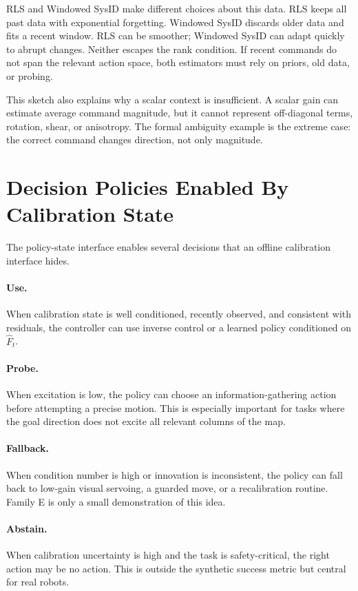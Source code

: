 \documentclass{article}
\newcommand{\cmaphat}{\hat F}
\begin{document}
RLS and Windowed SysID make different choices about this data. RLS keeps all
past data with exponential forgetting. Windowed SysID discards older data and
fits a recent window. RLS can be smoother; Windowed SysID can adapt quickly to
abrupt changes. Neither escapes the rank condition. If recent commands do not
span the relevant action space, both estimators must rely on priors, old data,
or probing.

This sketch also explains why a scalar context is insufficient. A scalar gain
can estimate average command magnitude, but it cannot represent off-diagonal
terms, rotation, shear, or anisotropy. The formal ambiguity example is the
extreme case: the correct command changes direction, not only magnitude.

\section{Decision Policies Enabled By Calibration State}

The policy-state interface enables several decisions that an offline
calibration interface hides.

\paragraph{Use.}
When calibration state is well conditioned, recently observed, and consistent
with residuals, the controller can use inverse control or a learned policy
conditioned on $\cmaphat_t$.

\paragraph{Probe.}
When excitation is low, the policy can choose an information-gathering action
before attempting a precise motion. This is especially important for tasks
where the goal direction does not excite all relevant columns of the map.

\paragraph{Fallback.}
When condition number is high or innovation is inconsistent, the policy can
fall back to low-gain visual servoing, a guarded move, or a recalibration
routine. Family E is only a small demonstration of this idea.

\paragraph{Abstain.}
When calibration uncertainty is high and the task is safety-critical, the
right action may be no action. This is outside the synthetic success metric but
central for real robots.
\end{document}
